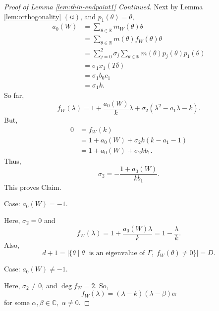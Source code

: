 \documentclass[
]{book}
\theoremstyle{definition}
\theoremstyle{definition}
\theoremstyle{definition}
\theoremstyle{definition}
\theoremstyle{remark}
\begin{document}
\begin{proof}[Proof of Lemma \ref{lem:thin-endpoint1} Continued]
Next by Lemma \ref{lem:orthogonality} \((ii)\), and \(p_1(\theta) = \theta\),
\begin{align}
a_0(W) & = \sum_{\theta\in \mathbb{R}}m_W(\theta)\theta\\
& = \sum_{\theta\in \mathbb{R}}m(\theta)f_W(\theta)\theta\\
& = \sum_{j = 0}^2\sigma_j\sum_{\theta\in \mathbb{R}}m(\theta)p_j(\theta)p_1(\theta)\\
& = \sigma_1 x_1(T\delta)\\
& = \sigma_1b_0c_1\\
& = \sigma_1 k.
\end{align}
So far,
\[f_W(\lambda) = 1 + \frac{a_0(W)}{k}\lambda + \sigma_2(\lambda^2 - a_1\lambda-k).\]
But,
\begin{align}
0 & = f_W(k)\\
& = 1 + a_0(W) + \sigma_2k(k-a_1-1)\\
& = 1 + a_0(W) + \sigma_2kb_1.
\end{align}
Thus,
\[\sigma_2 = -\frac{1+a_0(W)}{kb_1}.\]
This proves Claim.

Case: \(a_0(W) = -1\).

Here, \(\sigma_2 = 0\) and
\[f_W(\lambda) = 1 + \frac{a_0(W)\lambda}{k} = 1-\frac{\lambda}{k}.\]
Also,
\[d+1 = |\{\theta \mid \theta \;\text{ is an eigenvalue of $\Gamma$}, \; f_W(\theta)\neq 0\}| = D.\]

Case: \(a_0(W) \neq -1\).

Here, \(\sigma_2\neq 0\), and \(\deg f_W = 2\). So,
\[f_W(\lambda) = (\lambda - k)(\lambda - \beta)\alpha\]
for some \(\alpha, \beta\in \mathbb{C}, \; \alpha \neq 0\).


\end{proof}
\end{document}
